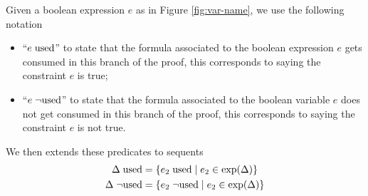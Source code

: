 \documentclass[a4paper, 12pt, tesi, english]{report}
\begin{document}
\begin{define}
	\label{def:used}
	Given a boolean expression $e$ as in Figure \ref{fig:var-name}, we use the following notation
	\begin{itemize}
		\item ``$e \; \text{used}$'' to state that the formula associated to the boolean expression $e$ gets consumed in this branch of the proof,
			this corresponds to saying the constraint $e$ is true;
		\item ``$e \; \neg\text{used}$'' to state that the formula associated to the boolean variable $e$ does not get consumed in this branch of the proof,
			this corresponds to saying the constraint $e$ is not true.
	\end{itemize}
	We then extends these predicates to sequents
	\begin{align*}
		\Delta \; \text{used} &= \{ e_2 \; \text{used} \mid e_2 \in \text{exp}(\Delta) \} \\
		\Delta \; \neg\text{used} &= \{ e_2 \; \neg\text{used} \mid e_2 \in \text{exp}(\Delta) \}
	\end{align*}
\end{define}
\end{document}
